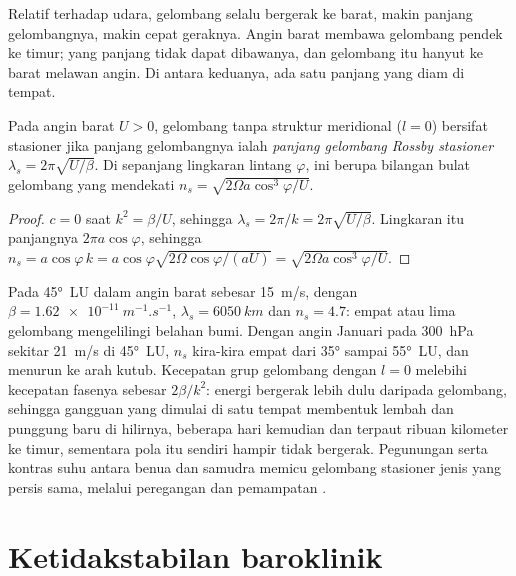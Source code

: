 Relatif terhadap udara, gelombang selalu bergerak ke barat, makin panjang
gelombangnya, makin cepat geraknya. Angin barat membawa gelombang pendek ke timur; yang panjang
tidak dapat dibawanya, dan gelombang itu hanyut ke barat melawan angin. Di antara keduanya,
ada satu panjang yang diam di tempat.

\begin{proposition}\label{prop:b3:atmospheric-dynamics:stationary}
Pada angin barat $U > 0$, gelombang tanpa struktur meridional ($l = 0$) bersifat stasioner
jika panjang gelombangnya ialah \emph{panjang gelombang Rossby
stasioner} $\lambda_s =
2\pi\sqrt{U/\beta}$. Di sepanjang lingkaran lintang $\varphi$, ini berupa bilangan bulat
gelombang yang mendekati $n_s = \sqrt{2\Omega a\cos^3\varphi/U}$.
\end{proposition}

\begin{proof}
$c = 0$ saat $k^2 = \beta/U$, sehingga $\lambda_s = 2\pi/k = 2\pi\sqrt{U/\beta}$.
Lingkaran itu panjangnya $2\pi a\cos\varphi$, sehingga $n_s = a\cos\varphi\,k =
a\cos\varphi\sqrt{2\Omega\cos\varphi/(aU)} = \sqrt{2\Omega a\cos^3\varphi/U}$.
\end{proof}

Pada \ang{45}~LU dalam angin barat sebesar \qty{15}{m/s}, dengan $\beta =
\qty{1.62e-11}{m^{-1}.s^{-1}}$, $\lambda_s = \qty{6050}{km}$ dan $n_s =
4.7$: empat atau lima gelombang mengelilingi belahan bumi. Dengan
 angin Januari pada \qty{300}{hPa} sekitar \qty{21}{m/s} di \ang{45}~LU, $n_s$ kira-kira
empat dari \ang{35} sampai \ang{55}~LU, dan menurun ke arah kutub. Kecepatan grup
gelombang dengan $l = 0$ melebihi kecepatan fasenya sebesar $2\beta/k^2$: energi
bergerak lebih dulu daripada gelombang, sehingga gangguan yang dimulai di satu tempat membentuk lembah dan punggung baru
di hilirnya, beberapa hari kemudian dan terpaut ribuan kilometer
ke timur, sementara pola itu sendiri hampir tidak bergerak. Pegunungan serta
kontras suhu antara benua dan samudra memicu gelombang stasioner
jenis yang persis sama, melalui peregangan dan pemampatan
.


\section{Ketidakstabilan baroklinik}\label{sec:b3:atmospheric-dynamics:baroclinic}

